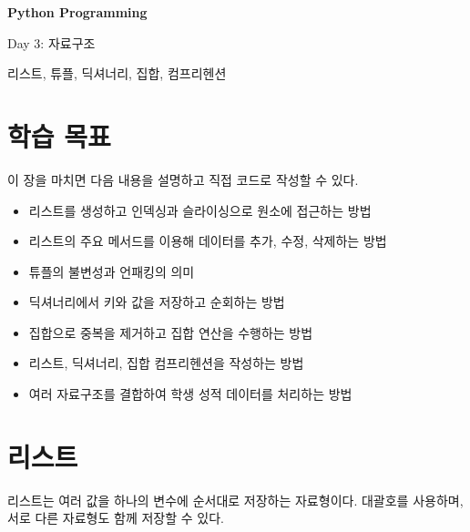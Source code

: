 \documentclass[11pt,a4paper]{article}
\begin{document}
\begin{titlepage}
    \centering
    \vspace*{3cm}

    {\Huge\bfseries Python Programming\par}
    \vspace{0.8cm}
    {\LARGE Day 3: 자료구조\par}

    \vspace{2cm}

    {\large 리스트, 튜플, 딕셔너리, 집합, 컴프리헨션\par}

    \vfill
\end{titlepage}

\tableofcontents
\newpage

\section{학습 목표}

\begin{learningbox}
이 장을 마치면 다음 내용을 설명하고 직접 코드로 작성할 수 있다.
\begin{itemize}[leftmargin=1.5em]
    \item 리스트를 생성하고 인덱싱과 슬라이싱으로 원소에 접근하는 방법
    \item 리스트의 주요 메서드를 이용해 데이터를 추가, 수정, 삭제하는 방법
    \item 튜플의 불변성과 언패킹의 의미
    \item 딕셔너리에서 키와 값을 저장하고 순회하는 방법
    \item 집합으로 중복을 제거하고 집합 연산을 수행하는 방법
    \item 리스트, 딕셔너리, 집합 컴프리헨션을 작성하는 방법
    \item 여러 자료구조를 결합하여 학생 성적 데이터를 처리하는 방법
\end{itemize}
\end{learningbox}

\section{리스트}

리스트는 여러 값을 하나의 변수에 순서대로 저장하는 자료형이다. 대괄호를 사용하며, 서로 다른 자료형도 함께 저장할 수 있다.
\end{document}
